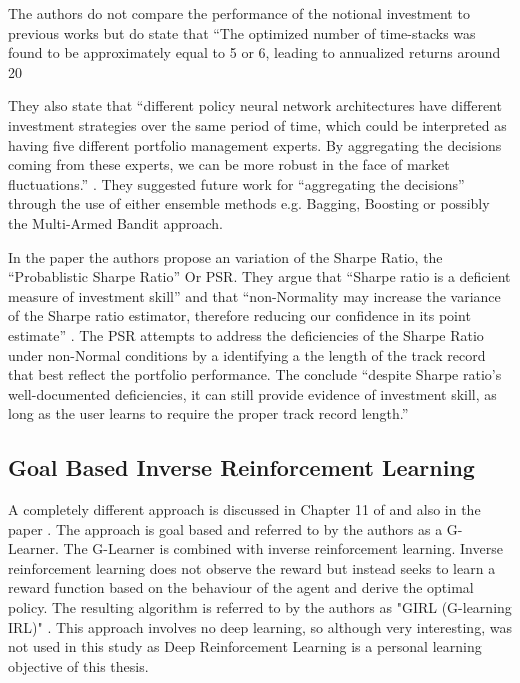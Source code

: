 \documentclass[oneside,12pt]{Classes/RoboticsLaTeX}
\begin{document}
\begin{itemize}
The authors do not compare the performance of the notional investment to previous works but do state that “The optimized number of time-stacks was found to be approximately equal to 5 or 6, leading to annualized returns around 20%

They also state that “different policy neural network architectures have different investment strategies over the same period of time, which could be interpreted as having five different portfolio management experts. By aggregating the decisions coming from these experts, we can be more robust in the face of market fluctuations.” \citep[p12]{ABOUSSALAH2020112891}. They suggested future work for “aggregating the decisions” through the use of either ensemble methods e.g. Bagging, Boosting or possibly the Multi-Armed Bandit approach.

In the paper \citep{BaileyDavidH2012Tsre} the authors propose an variation of the Sharpe Ratio, the “Probablistic Sharpe Ratio” \citep[p.3]{BaileyDavidH2012Tsre} Or PSR. They argue that “Sharpe ratio is a deficient measure of investment skill” and that “non-Normality may increase the variance of the Sharpe ratio estimator, therefore reducing our confidence in its point estimate” \citet[p.4]{BaileyDavidH2012Tsre}. The PSR attempts to address the deficiencies of the Sharpe Ratio under non-Normal conditions by a identifying a the length of the track record that best reflect the portfolio performance. The conclude “despite Sharpe ratio’s well-documented deficiencies, it can still provide evidence of investment skill, as long as the user learns to require the proper track record length.” \citep[p.15]{BaileyDavidH2012Tsre}

\subsection{Goal Based Inverse Reinforcement Learning}
A completely different approach is discussed in Chapter 11 of \citet{DixonMatthewF2020MLiF} and also in the paper \citet{dixon2020glearner}. The approach is goal based and referred to by the authors as a G-Learner. The G-Learner is combined with inverse reinforcement learning. Inverse reinforcement learning does not observe the reward but instead seeks to learn a reward function based on the behaviour of the agent and derive the optimal policy. The resulting algorithm is referred to by the authors as "GIRL (G-learning IRL)" \citep[p5-18]{dixon2020glearner}. This approach involves no deep learning, so although very interesting, was not used in this study as Deep Reinforcement Learning is a personal learning objective of this thesis.                                                                                                    


\end{itemize}
\end{document}
